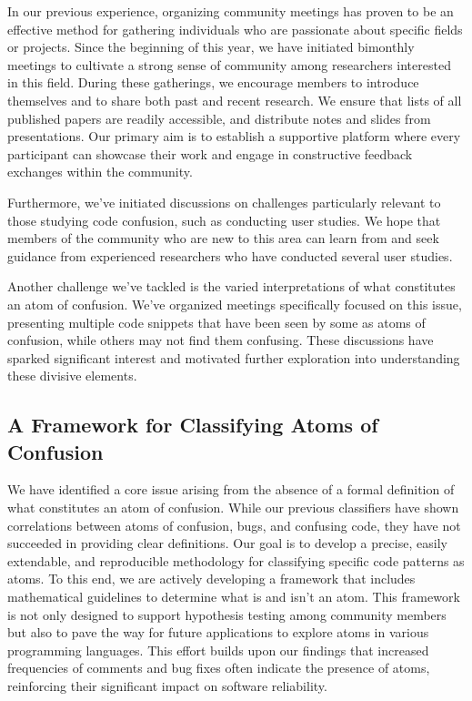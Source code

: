 \documentclass[conference]{IEEEtran}
\begin{document}
In our previous experience, organizing community meetings has proven to be an effective method for gathering individuals who are passionate about specific fields or projects. Since the beginning of this year, we have initiated bimonthly meetings to cultivate a strong sense of community among researchers interested in this field. During these gatherings, we encourage members to introduce themselves and to share both past and recent research. We ensure that lists of all published papers are readily accessible, and distribute notes and slides from presentations. Our primary aim is to establish a supportive platform where every participant can showcase their work and engage in constructive feedback exchanges within the community.

Furthermore, we've initiated discussions on challenges particularly relevant to those studying code confusion, such as conducting user studies. We hope that members of the community who are new to this area can learn from and seek guidance from experienced researchers who have conducted several user studies.

Another challenge we've tackled is the varied interpretations of what constitutes an atom of confusion. We've organized meetings specifically focused on this issue, presenting multiple code snippets that have been seen by some as atoms of confusion, while others may not find them confusing. These discussions have sparked significant interest and motivated further exploration into understanding these divisive elements.


\subsection{A Framework for Classifying Atoms of Confusion}

We have identified a core issue arising from the absence of a formal definition of what constitutes an atom of confusion. While our previous classifiers \cite{gopstein2018prevalence} have shown correlations between atoms of confusion, bugs, and confusing code, they have not succeeded in providing clear definitions. Our goal is to develop a precise, easily extendable, and reproducible methodology for classifying specific code patterns as atoms. To this end, we are actively developing a framework that includes mathematical guidelines to determine what is and isn't an atom. This framework is not only designed to support hypothesis testing among community members but also to pave the way for future applications to explore atoms in various programming languages. This effort builds upon our findings that increased frequencies of comments and bug fixes often indicate the presence of atoms, reinforcing their significant impact on software reliability.
\end{document}
